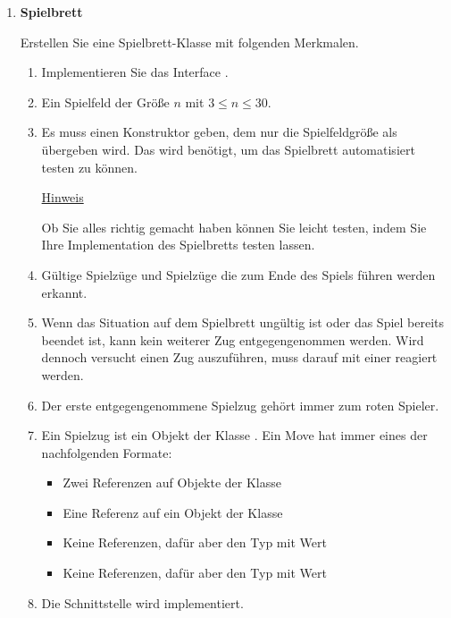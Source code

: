 \begin{enumerate}
\begin{enumerate}
\end{enumerate}


\item \textbf{Spielbrett}


Erstellen Sie eine Spielbrett-Klasse mit folgenden Merkmalen.

\begin{enumerate}
\item Implementieren Sie das Interface .
\item Ein Spielfeld der Größe $n$ mit $3 \le n \le 30$.
\item Es muss einen Konstruktor geben, dem nur die Spielfeldgröße als  übergeben wird. Das wird benötigt, um das Spielbrett automatisiert testen zu können.

\underline{Hinweis}

Ob Sie alles richtig gemacht haben können Sie leicht testen, indem Sie Ihre Implementation des Spielbretts testen lassen.
\item Gültige Spielzüge und Spielzüge die zum Ende des Spiels führen werden erkannt.
\item Wenn das Situation auf dem Spielbrett ungültig ist oder das Spiel bereits beendet ist, kann kein weiterer Zug entgegengenommen werden. Wird dennoch versucht einen Zug auszuführen, muss darauf mit einer  reagiert werden.
\item Der erste entgegengenommene Spielzug gehört immer zum roten Spieler.
\item Ein Spielzug ist ein Objekt der Klasse . Ein Move hat immer eines der nachfolgenden Formate:
\begin{itemize}
\item Zwei Referenzen auf Objekte der Klasse 
\item Eine Referenz auf ein Objekt der Klasse 
\item Keine Referenzen, dafür aber den Typ  mit Wert 
\item Keine Referenzen, dafür aber den Typ  mit Wert 
\end{itemize}
\item Die Schnittstelle  wird implementiert. 

\end{enumerate}


\end{enumerate}
